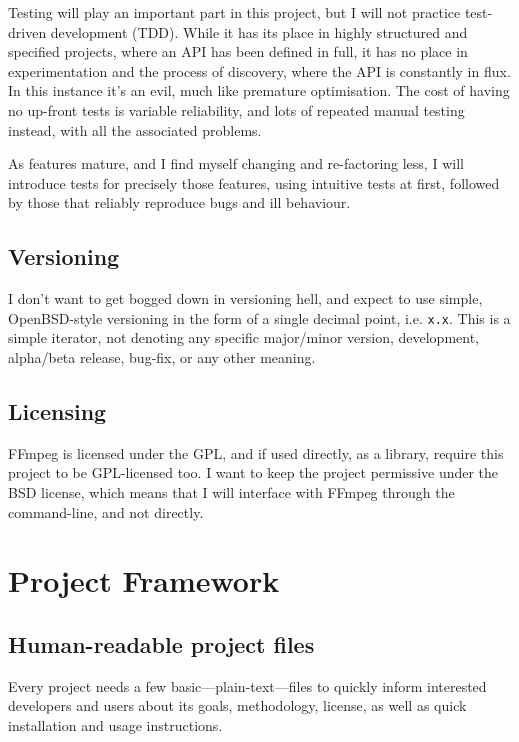 \documentclass{article}
\begin{document}
Testing will play an important part in this project, but I will not practice
test-driven development (TDD). While it has its place in highly structured and
specified projects, where an API has been defined in full, it has no place in
experimentation and the process of discovery, where the API is constantly in
flux. In this instance it's an evil, much like premature optimisation. The cost
of having no up-front tests is variable reliability, and lots of repeated manual
testing instead, with all the associated problems.

As features mature, and I find myself changing and re-factoring less, I will
introduce tests for precisely those features, using intuitive tests at first,
followed by those that reliably reproduce bugs and ill behaviour.

\subsection{Versioning}
\label{sec:org496537c}

I don't want to get bogged down in versioning hell, and expect to use simple,
OpenBSD-style versioning in the form of a single decimal point, i.e. \texttt{x.x}.
This is a simple iterator, not denoting any specific major/minor version,
development, alpha/beta release, bug-fix, or any other meaning.

\subsection{Licensing}
\label{sec:org15ec158}

FFmpeg is licensed under the GPL, and if used directly, as a library, require
this project to be GPL-licensed too. I want to keep the project permissive
under the BSD license, which means that I will interface with FFmpeg through the
command-line, and not directly.

\section{Project Framework}
\label{sec:org813da34}

\subsection{Human-readable project files}
\label{sec:orgd7d353d}

Every project needs a few basic---plain-text---files to quickly inform
interested developers and users about its goals, methodology, license, as well
as quick installation and usage instructions.
\end{document}
